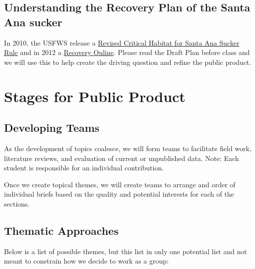 \documentclass{tufte-handout}\usepackage[]{graphicx}\usepackage[]{color}
\begin{document}
\subsection{Understanding the Recovery Plan of the Santa Ana sucker}

In 2010, the USFWS release a \href{https://www.gpo.gov/fdsys/pkg/FR-2010-12-14/pdf/2010-30447.pdf#page=2}{Revised Critical Habitat for Santa Ana Sucker Rule} and in 2012 a \href{https://www.fws.gov/carlsbad/SpeciesStatusList/RP/201411xx_Draft%20RP_SASU.pdf}{Recovery Ouline}. Please read the Draft Plan before class and we will use this to help create the driving question and refine the public product. 

\section{Stages for Public Product}

\subsection{Developing Teams}

As the development of topics coalesce, we will form teams to facilitate field work, literature reviews, and evaluation of current or unpublished data. Note: Each student is responsible for an individual contribution. 

Once we create topical themes, we will create teams to arrange and order of  individual briefs based on the quality and potential interests for each of the sections.  

\subsection{Thematic Approaches}

Below is a list of possible themes, but this list in only one potential list and not meant to constrain how we decide to work as a group: 
\end{document}
